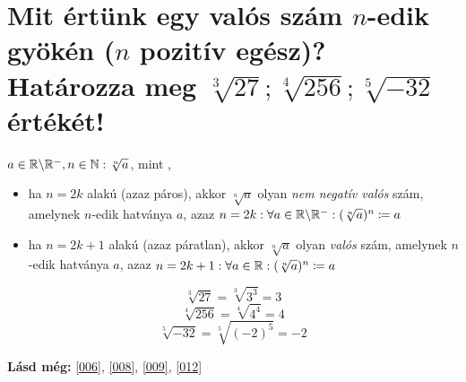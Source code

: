 \section{Mit értünk egy valós szám \texorpdfstring{$n$}{n}-edik gyökén 
  (\texorpdfstring{$n$}{n} pozitív egész)? Határozza meg 
  \texorpdfstring{$\sqrt[3]{27}; \sqrt[4]{256}; \sqrt[5]{-32}$}
  {27**(1/3); 256**(1/4); -32**(1/5)} értékét!}
\label{013}

\begin{defin}
$a \in \mathbb{R} \backslash \mathbb{R}^-, n \in \mathbb{N}: \sqrt[n]{a}$, mint
,
\begin{itemize}
  \item ha $n = 2k$ alakú (azaz páros), akkor $\sqrt[n]{a}$ olyan \emph{nem
    negatív valós} szám, amelynek $n$-edik hatványa $a$, azaz
    $n = 2k: \forall a \in \mathbb{R} \backslash \mathbb{R}^-: 
      (\sqrt[n]{a})^n \coloneqq a$
  \item ha $n = 2k+1$ alakú (azaz páratlan), akkor $\sqrt[n]{a}$ olyan 
    \emph{valós} szám, amelynek $n$-edik hatványa $a$, azaz
    $n = 2k + 1: \forall a \in \mathbb{R}: (\sqrt[n]{a})^n \coloneqq a$
\end{itemize}
\end{defin}

\[
  \sqrt[3]{27} = \sqrt[3]{3^3} = 3
\]
\[
  \sqrt[4]{256} = \sqrt[4]{4^4} = 4
\]
\[
  \sqrt[5]{-32} = \sqrt[5]{(-2)^5} = -2
\]

\textbf{Lásd még:} \ref{006}, \ref{008}, \ref{009}, \ref{012}